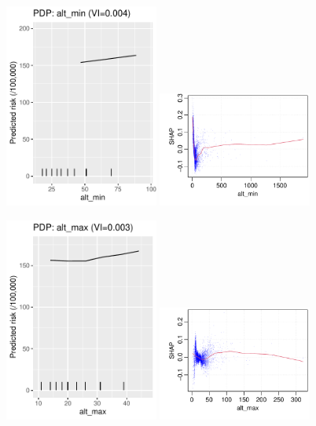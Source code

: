 \documentclass[12pt]{article}
\begin{document}
\begin{figure}[h]
\centering
\includegraphics[width=0.45\textwidth]{figures/pdp/alt_min.pdf}
\includegraphics[width=0.45\textwidth]{figures/shap/alt_min.pdf}
\end{figure}
\begin{figure}[h]
\centering
\includegraphics[width=0.45\textwidth]{figures/pdp/alt_max.pdf}
\includegraphics[width=0.45\textwidth]{figures/shap/alt_max.pdf}
\end{figure}
\end{document}
